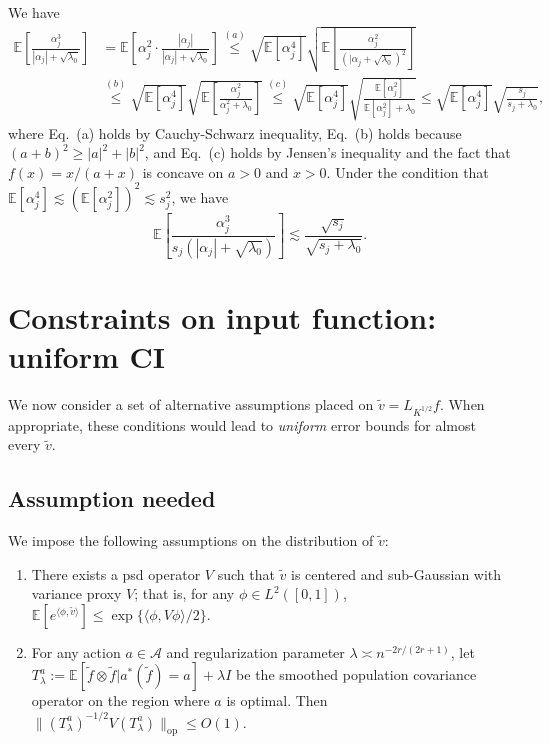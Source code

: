 \documentclass[11pt,a4paper]{article}
\renewcommand{\tilde}{\widetilde}
\theoremstyle{definition}
\theoremstyle{plain}
\theoremstyle{remark}
\newcommand{\op}{\mathrm{op}}
\newcommand{\mA}{\mathcal A}
\begin{document}
We have
\begin{align*}
\mathbb E\left[\frac{\alpha_j^3}{|\alpha_j|+\sqrt{\lambda_0}}\right] &= \mathbb E\left[\alpha_j^2\cdot \frac{|\alpha_j|}{|\alpha_j|+\sqrt{\lambda_0}}\right] \overset{(a)}{\leq} \sqrt{\mathbb E[\alpha_j^4]}\sqrt{\mathbb E\left[\frac{\alpha_j^2}{(|\alpha_j+\sqrt{\lambda_0})^2}\right]}\\
&\overset{(b)}{\leq} \sqrt{\mathbb E[\alpha_j^4]}\sqrt{\mathbb E\left[\frac{\alpha_j^2}{\alpha_j^2+\lambda_0}\right]}
\overset{(c)}{\leq} \sqrt{\mathbb E[\alpha_j^4]}\sqrt{\frac{\mathbb E[\alpha_j^2]}{\mathbb E[\alpha_j^2]+\lambda_0}} \leq \sqrt{\mathbb E[\alpha_j^4]}\sqrt{\frac{s_j}{s_j+\lambda_0}},
\end{align*}
where Eq.~(a) holds by Cauchy-Schwarz inequality, Eq.~(b) holds because $(a+b)^2\geq |a|^2+|b|^2$, and Eq.~(c) holds by Jensen's inequality and the fact that $f(x)=x/(a+x)$ is concave on $a>0$ and $x>0$.
{\color{red} Under the condition that $\mathbb E[\alpha_j^4] \lesssim (\mathbb E[\alpha_j^2])^2 \lesssim s_j^2$}, we have
$$
\mathbb E\left[\frac{\alpha_j^3}{s_j(|\alpha_j|+\sqrt{\lambda_0})}\right] \lesssim \frac{\sqrt{s_j}}{\sqrt{s_j+\lambda_0}}.
$$

\section{Constraints on input function: uniform CI}\label{sec:uniform}

We now consider a set of alternative assumptions placed on $\tilde v=L_{K^{1/2}}f$. When appropriate, these conditions would lead to \emph{uniform} error bounds for almost every $\tilde v$.

\subsection{Assumption needed}

We impose the following assumptions on the distribution of $\tilde v$:
\begin{enumerate}
\item There exists a psd operator $V$ such that $\tilde v$ is centered and sub-Gaussian with variance proxy $V$; that is, for any $\phi\in L^2([0,1])$, $\mathbb E[e^{\langle\phi,\tilde v\rangle}] \leq \exp\{\langle\phi, V\phi\rangle/2\}$.
\item For any action $a\in\mA$ and regularization parameter $\lambda\asymp n^{-2r/(2r+1)}$, let $T_\lambda^a := \mathbb E[\tilde f\otimes\tilde f| a^*(\tilde f)=a] + \lambda I$ be the smoothed population covariance operator on the region where $a$ is optimal. Then $\|(T_\lambda^a)^{-1/2} V (T_\lambda^a)\|_\op \leq O(1)$.
\end{enumerate}
\end{document}
